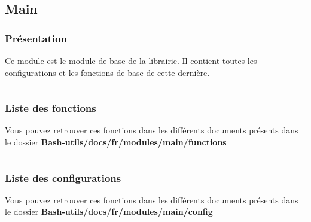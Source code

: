 \documentclass[a4paper,10pt]{article}
\begin{document}
    \color{sec2}
    \subsection{Main}\color{text}

    \color{sec3}
    \subsubsection{Présentation}\color{text}

    \begin{justify}
        Ce module est le module de base de la librairie. Il contient toutes les configurations et les fonctions de base de cette dernière.
    \end{justify}


    \color{sec3}\par\noindent\rule{\textwidth}{0.4pt}\color{text}

    \color{sec3}
    \subsubsection{Liste des fonctions}\color{text}

    \begin{justify}
        Vous pouvez retrouver ces fonctions dans les différents documents présents dans le dossier \textbf{\color{path}Bash-utils/docs/fr/modules/main/functions}
    \end{justify}%


    \color{sec3}\par\noindent\rule{\textwidth}{0.4pt}\color{text}

    \color{sec3}
    \subsubsection{Liste des configurations}\color{text}

    \begin{justify}
        Vous pouvez retrouver ces fonctions dans les différents documents présents dans le dossier \textbf{\color{path}Bash-utils/docs/fr/modules/main/config}
    \end{justify}
\end{document}
